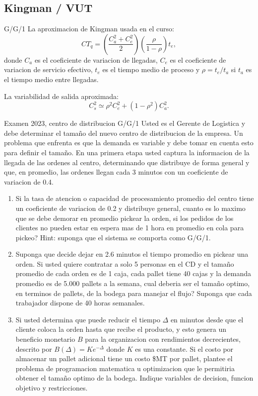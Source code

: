 \subsection{Kingman / VUT}

\begin{materia}{G/G/1}
La aproximacion de Kingman usada en el curso:
\[
  CT_q=
  \left(\frac{C_a^2+C_e^2}{2}\right)
  \left(\frac{\rho}{1-\rho}\right)t_e,
\]
donde $C_a$ es el coeficiente de variacion de llegadas, $C_e$ es el coeficiente de variacion de servicio efectivo, $t_e$ es el tiempo medio de proceso y $\rho=t_e/t_a$ si $t_a$ es el tiempo medio entre llegadas.

La variabilidad de salida aproximada:
\[
  C_s^2\simeq \rho^2C_e^2+(1-\rho^2)C_a^2.
\]
\end{materia}

\begin{enunciado}{Examen 2023, centro de distribucion G/G/1}
Usted es el Gerente de Logistica y debe determinar el tamaño del nuevo centro de distribucion de la empresa. Un problema que enfrenta es que la demanda es variable y debe tomar en cuenta esto para definir el tamaño. En una primera etapa usted captura la informacion de la llegada de las ordenes al centro, determinando que distribuye de forma general y que, en promedio, las ordenes llegan cada 3 minutos con un coeficiente de variacion de 0.4.

\begin{enumerate}[label=\alph*)]
  \item Si la tasa de atencion o capacidad de procesamiento promedio del centro tiene un coeficiente de variacion de 0.2 y distribuye general, cuanto es lo maximo que se debe demorar en promedio pickear la orden, si los pedidos de los clientes no pueden estar en espera mas de 1 hora en promedio en cola para pickeo? Hint: suponga que el sistema se comporta como G/G/1.
  \item Suponga que decide dejar en 2.6 minutos el tiempo promedio en pickear una orden. Si usted quiere contratar a solo 5 personas en el CD y el tamaño promedio de cada orden es de 1 caja, cada pallet tiene 40 cajas y la demanda promedio es de 5.000 pallets a la semana, cual deberia ser el tamaño optimo, en terminos de pallets, de la bodega para manejar el flujo? Suponga que cada trabajador dispone de 40 horas semanales.
  \item Si usted determina que puede reducir el tiempo $\Delta$ en minutos desde que el cliente coloca la orden hasta que recibe el producto, y esto genera un beneficio monetario $B$ para la organizacion con rendimientos decrecientes, descrito por $B(\Delta)=Ke^{-\Delta}$ donde $K$ es una constante. Si el costo por almacenar un pallet adicional tiene un costo \$MT por pallet, plantee el problema de programacion matematica u optimizacion que le permitiria obtener el tamaño optimo de la bodega. Indique variables de decision, funcion objetivo y restricciones.
\end{enumerate}
\end{enunciado}

